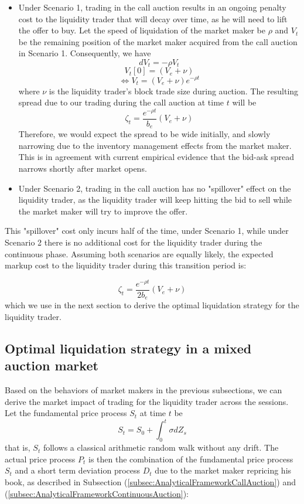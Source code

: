 \begin{itemize}
  \item Under Scenario 1, trading in the call auction results in an ongoing penalty cost to the liquidity trader that will decay over time, as he will need to lift the offer to buy. Let the speed of liquidation of the market maker be $\rho$ and $V_t$ be the remaining position of the market maker acquired from the call auction in Scenario 1. Consequently, we have
        \[
          dV_t = -\rho V_t
        \]
        \[
          V_t[0]=(V_e + \nu)
        \]
        \begin{equation}\label{eqn:recovery_term_eqb}
          \Leftrightarrow V_t = (V_e + \nu) e^{-\rho t}
        \end{equation}
        where $\nu$ is the liquidity trader's block trade size during auction. The resulting spread due to our trading during the call auction at time $t$ will be
        \[
          \zeta_t = \frac{e^{-\rho t}}{b_e}  (V_e + \nu)
        \]
        Therefore, we would expect the spread to be wide initially, and slowly narrowing due to the inventory management effects from the market maker. This is in agreement with current empirical evidence that the bid-ask spread narrows shortly after market opens.
  \item Under Scenario 2, trading in the call auction has no "spillover" effect on the liquidity trader, as the liquidity trader will keep hitting the bid to sell while the market maker will try to improve the offer.
\end{itemize}

This "spillover" cost only incurs half of the time, under Scenario 1, while under Scenario 2 there is no additional cost for the liquidity trader during the continuous phase. Assuming both scenarios are equally likely, the expected markup cost to the liquidity trader during this transition period is:

\begin{equation}\label{resilence_term}
  \zeta_t = \frac{e^{-\rho t}}{2 b_e}  (V_e + \nu)
\end{equation}
which we use in the next section to derive the optimal liquidation strategy for the liquidity trader.

\subsection{Optimal liquidation strategy in a mixed auction market}

Based on the behaviors of market makers in the previous subsections, we can derive the market impact of trading for the liquidity trader across the sessions. Let the fundamental price process $S_t$ at time $t$ be
\[
  S_t = S_0 + \int_0^t \sigma dZ_s
\]
that is, $S_t$ follows a classical arithmetic random walk without any drift. The actual price process $P_t$ is then the combination of the fundamental price process $S_t$ and a short term deviation process $D_t$ due to the market maker repricing his book, as described in Subsection (\ref{subsec:AnalyticalFrameworkCallAuction}) and (\ref{subsec:AnalyticalFrameworkContinuousAuction}):

